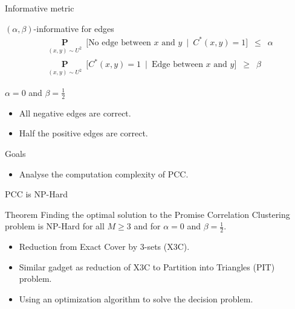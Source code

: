 \documentclass{beamer}
\newcommand{\mb}{\mathbf}
\begin{document}
\begin{frame}[label=informativeMetric]{Informative metric}
	\begin{block}{$(\alpha, \beta)$-informative for edges}		
		\vspace{-10pt}\begin{align*}
			&\underset{(x, y) \sim U^2}{\mb P}\enspace \big[ \text{No edge between $x$ and $y$} \enspace|\enspace C^*(x, y) = 1\big] \enspace \le \enspace \alpha \\
			&\underset{(x, y) \sim U^2}{\mb P}\enspace \big[C^*(x, y) = 1 \enspace|\enspace \text{Edge between $x$ and $y$}  \big] \enspace \ge \enspace \beta 
		\end{align*}
	\end{block}	
	
	\vspace{30pt}$\alpha = 0$ and $\beta = \frac{1}{2}$
	\begin{itemize}
		\vspace{10pt}\item All negative edges are correct.
		\vspace{10pt}\item Half the positive edges are correct.
	\end{itemize}
\end{frame}

\begin{frame}{Goals}

	\begin{itemize}
		\item Analyse the computation complexity of PCC.
	\end{itemize}	 
\end{frame}

\begin{frame}{PCC is NP-Hard}
	\begin{block}{Theorem}
		Finding the optimal solution to the Promise Correlation Clustering problem is NP-Hard for all $M \ge 3$ and for $\alpha = 0$ and $\beta = \frac{1}{2}$.  
	\end{block}
	
	\vspace{20pt}
	\begin{itemize}
		\item Reduction from Exact Cover by $3$-sets (X3C).\\
		\vspace{10pt}\item Similar gadget as reduction of X3C to Partition into Triangles (PIT) problem.
		\vspace{10pt}\item Using an optimization algorithm to solve the decision problem.  

	\end{itemize}
\end{frame}
\end{document}
